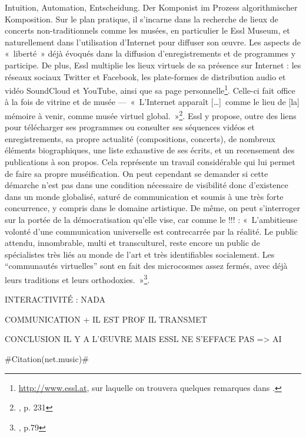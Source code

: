 \documentclass[a4paper,12pt]{article}
\newcommand{\guill}[1]{«~#1~»}
\newcommand{\guilldeux}[1]{“#1”}
\newcommand{\zitat}[2]{\#Citation(#2)\#}
\newcommand{\tpp}[0]{[\dots]}
\begin{document}
{{Intuition, Automation, Entscheidung. Der Komponist im Prozess algorithmischer Komposition}}. Sur le plan pratique, il s'incarne dans la recherche de lieux de concerts non-traditionnels comme les musées, en particulier le Essl Museum, et naturellement dans l'utilisation d'Internet pour diffuser son œuvre. Les aspects de \guill{liberté} déjà évoqués dans la diffusion d'enregistrements et de programmes y participe. De plus, Essl multiplie les lieux virtuels de sa présence sur Internet : les réseaux sociaux Twitter et Facebook, les plate-formes de distribution audio et vidéo SoundCloud et YouTube, ainsi que sa page personnelle\footnote{\href{http://www.essl.at}{http://www.essl.at}, sur laquelle on trouvera quelques remarques dans \cite{Der Wiener Komponist Karlheinz Essl (Hanno Ehrler)}.}. Celle-ci fait office à la fois de vitrine et de musée ---~\guill{L'Internet apparaît \tpp~comme le lieu de [la] mémoire à venir, comme musée virtuel global.}\footnote{\cite{couchot2003art}, p. 231}. Essl y propose, outre des liens pour télécharger ses programmes ou consulter ses séquences vidéos et enregistrements, sa propre actualité (compositions, concerts), de nombreux éléments biographiques, une liste exhaustive de ses écrits, et un recensement des publications à son propos. Cela représente un travail considérable qui lui permet de faire sa propre muséification. On peut cependant se demander si cette démarche n'est pas dans une condition nécessaire de visibilité donc d'existence dans un monde globalisé, saturé de communication et soumis à une très forte concurrence, y compris dans le domaine artistique. De même, on peut s'interroger sur la portée de la démocratisation qu'elle vise, car comme le !!! : \guill{L'ambitieuse volonté d'une communication universelle est contrecarrée par la réalité. Le public attendu, innombrable, multi et transculturel, reste encore un public de spécialistes très liés au monde de l'art et très identifiables socialement. Les \guilldeux{communautés virtuelles} sont en fait des microcosmes assez fermés, avec déjà leurs traditions et leurs orthodoxies.}\footnote{\cite{couchot2003art}, p.79}.


INTERACTIVITÉ : NADA




COMMUNICATION
+ IL EST PROF IL TRANSMET


CONCLUSION IL Y A L'ŒUVRE MAIS ESSL NE S'EFFACE PAS
=> AI

\zitat{Vom Bewohner eines Elfenbeinturmes bin ich peu-à-peu zum global citizen geworden, dessen Tätigkeit sich nicht mehr allein im Verfertigen komplexer Partituren erschöpft. Durch den Kontakt mit Gleichgesinnten, der zunächst hauptsächlich über Mailing-Lists ausgetragen wurde, reiften in mir neue Ideen, die den für mich bislang gültigen Werkcharakter von Musik immer fragwürdiger werden ließen.
Der nicht-hierarchische Charakter des Internets mit seiner rhizomatischen Struktur zeigt vielfache Entsprechungen zu meiner persönlichen Sichtweise, Musik als kommunikatives Netzwerk aufzufassen und dieses auch sinnlich erfahrbar zu machen.}
{net.music}
\end{document}
